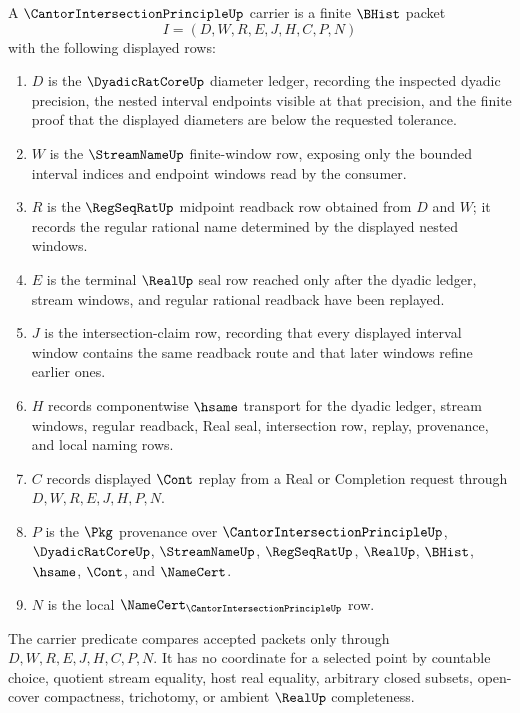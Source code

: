 \begin{definition}
\label{def:cantor-intersection-principle-carrier}
A $\CantorIntersectionPrincipleUp$ carrier is a finite $\BHist$ packet
$$
I=(D,W,R,E,J,H,C,P,N)
$$
with the following displayed rows:
\begin{enumerate}
\item $D$ is the $\DyadicRatCoreUp$ diameter ledger, recording the inspected dyadic precision, the nested interval endpoints visible at that precision, and the finite proof that the displayed diameters are below the requested tolerance.
\item $W$ is the $\StreamNameUp$ finite-window row, exposing only the bounded interval indices and endpoint windows read by the consumer.
\item $R$ is the $\RegSeqRatUp$ midpoint readback row obtained from $D$ and $W$; it records the regular rational name determined by the displayed nested windows.
\item $E$ is the terminal $\RealUp$ seal row reached only after the dyadic ledger, stream windows, and regular rational readback have been replayed.
\item $J$ is the intersection-claim row, recording that every displayed interval window contains the same readback route and that later windows refine earlier ones.
\item $H$ records componentwise $\hsame$ transport for the dyadic ledger, stream windows, regular readback, Real seal, intersection row, replay, provenance, and local naming rows.
\item $C$ records displayed $\Cont$ replay from a Real or Completion request through $D,W,R,E,J,H,P,N$.
\item $P$ is the $\Pkg$ provenance over $\CantorIntersectionPrincipleUp$, $\DyadicRatCoreUp$, $\StreamNameUp$, $\RegSeqRatUp$, $\RealUp$, $\BHist$, $\hsame$, $\Cont$, and $\NameCert$.
\item $N$ is the local $\NameCert_{\CantorIntersectionPrincipleUp}$ row.
\end{enumerate}
The carrier predicate compares accepted packets only through $D,W,R,E,J,H,C,P,N$. It has no coordinate for a selected point by countable choice, quotient stream equality, host real equality, arbitrary closed subsets, open-cover compactness, trichotomy, or ambient $\RealUp$ completeness.
\end{definition}

